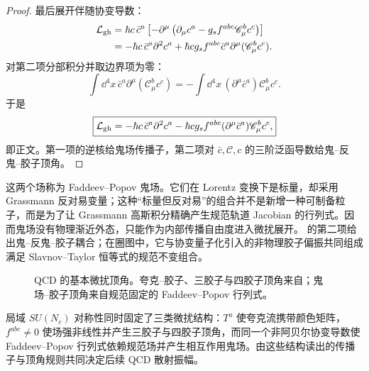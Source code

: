 \begin{proof}
最后展开伴随协变导数：
\begin{align*}
 \mathcal L_{\rm gh}
 &=\hbar c\,\bar c^a
 \left[-\partial^\mu
 \left(\partial_\mu c^a-g_sf^{abc}\mathscr C_\mu^bc^c\right)\right]\\
 &=-\hbar c\,\bar c^a\partial^2c^a
 +\hbar c g_sf^{abc}\bar c^a\partial^\mu(\mathscr C_\mu^bc^c).
\end{align*}
对第二项分部积分并取边界项为零：
\begin{equation*}
 \int\dd^4x\,\bar c^a\partial^\mu(\mathscr C_\mu^bc^c)
 =-\int\dd^4x\,(\partial^\mu\bar c^a)\mathscr C_\mu^bc^c.
\end{equation*}
于是
\begin{equation*}
 \boxed{
 \mathcal L_{\rm gh}
 =-\hbar c\,\bar c^a\partial^2c^a
 -\hbar c g_sf^{abc}(\partial^\mu\bar c^a)\mathscr C_\mu^bc^c,}
\end{equation*}
即正文。第一项的逆核给鬼场传播子，第二项对 $\bar c,\mathscr C,c$ 的三阶泛函导数给鬼--反鬼--胶子顶角。
\end{proof}

这两个场称为 Faddeev--Popov 鬼场。它们在 Lorentz 变换下是标量，却采用 Grassmann 反对易变量；这种“标量但反对易”的组合并不是新增一种可制备粒子，而是为了让 Grassmann 高斯积分精确产生规范轨道 Jacobian 的行列式。因而鬼场没有物理渐近外态，只能作为内部传播自由度进入微扰展开。 的第二项给出鬼--反鬼--胶子耦合；在圈图中，它与协变量子化引入的非物理胶子偏振共同组成满足 Slavnov--Taylor 恒等式的规范不变组合。

\begin{figure}[htbp]
\centering

\caption{QCD 的基本微扰顶角。夸克--胶子、三胶子与四胶子顶角来自；鬼场--胶子顶角来自规范固定的 Faddeev--Popov 行列式。}
\label{fig:qcd-elementary-vertices-dp10}
\end{figure}


局域 $SU(N_c)$ 对称性同时固定了三类微扰结构：$T^a$ 使夸克流携带颜色矩阵，$f^{abc}\neq0$ 使场强非线性并产生三胶子与四胶子顶角，而同一个非阿贝尔协变导数使 Faddeev--Popov 行列式依赖规范场并产生相互作用鬼场。由这些结构读出的传播子与顶角规则共同决定后续 QCD 散射振幅。



